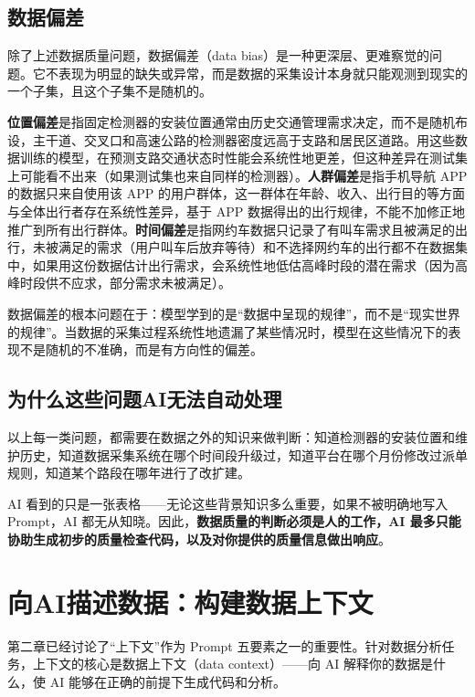 \subsection{数据偏差}

除了上述数据质量问题，数据偏差（data bias）是一种更深层、更难察觉的问题。它不表现为明显的缺失或异常，而是数据的采集设计本身就只能观测到现实的一个子集，且这个子集不是随机的。

\textbf{位置偏差}是指固定检测器的安装位置通常由历史交通管理需求决定，而不是随机布设，主干道、交叉口和高速公路的检测器密度远高于支路和居民区道路。用这些数据训练的模型，在预测支路交通状态时性能会系统性地更差，但这种差异在测试集上可能看不出来（如果测试集也来自同样的检测器）。\textbf{人群偏差}是指手机导航 APP 的数据只来自使用该 APP 的用户群体，这一群体在年龄、收入、出行目的等方面与全体出行者存在系统性差异，基于 APP 数据得出的出行规律，不能不加修正地推广到所有出行群体。\textbf{时间偏差}是指网约车数据只记录了有叫车需求且被满足的出行，未被满足的需求（用户叫车后放弃等待）和不选择网约车的出行都不在数据集中，如果用这份数据估计出行需求，会系统性地低估高峰时段的潜在需求（因为高峰时段供不应求，部分需求未被满足）。

数据偏差的根本问题在于：模型学到的是“数据中呈现的规律”，而不是“现实世界的规律”。当数据的采集过程系统性地遗漏了某些情况时，模型在这些情况下的表现不是随机的不准确，而是有方向性的偏差。

\subsection{为什么这些问题AI无法自动处理}

以上每一类问题，都需要在数据之外的知识来做判断：知道检测器的安装位置和维护历史，知道数据采集系统在哪个时间段升级过，知道平台在哪个月份修改过派单规则，知道某个路段在哪年进行了改扩建。

AI 看到的只是一张表格——无论这些背景知识多么重要，如果不被明确地写入 Prompt，AI 都无从知晓。因此，\textbf{数据质量的判断必须是人的工作，AI 最多只能协助生成初步的质量检查代码，以及对你提供的质量信息做出响应}。

\section{向AI描述数据：构建数据上下文}

第二章已经讨论了“上下文”作为 Prompt 五要素之一的重要性。针对数据分析任务，上下文的核心是数据上下文（data context）——向 AI 解释你的数据是什么，使 AI 能够在正确的前提下生成代码和分析。

